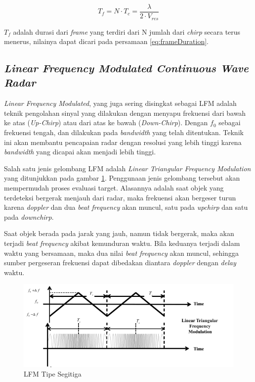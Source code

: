 \begin{equation}
	T_{f} = N \cdot T_{c} = \frac{\lambda}{2 \cdot V_{res}}
	\label{eq:frameDuration}
\end{equation}

$T_{f}$ adalah durasi dari \textit{frame} yang terdiri dari N jumlah dari \textit{chirp} secara terus menerus, nilainya dapat dicari pada persamaan \ref{eq:frameDuration}.

\subsection{\textit{Linear Frequency Modulated Continuous Wave Radar}}
\textit{Linear Frequency Modulated}, yang juga sering disingkat sebagai LFM adalah teknik pengolahan sinyal yang dilakukan dengan menyapu frekuensi dari bawah ke atas (\textit{Up-Chirp}) atau dari atas ke bawah (\textit{Down-Chirp}). Dengan $f_{0}$ sebagai frekuensi tengah, dan dilakukan pada \textit{bandwidth} yang telah ditentukan. Teknik ini akan membantu pencapaian radar dengan resolusi yang lebih tinggi karena \textit{bandwidth} yang dicapai akan menjadi lebih tinggi.

Salah satu jenis gelombang LFM adalah \textit{Linear Triangular Frequency Modulation} yang ditunjukkan pada gambar \ref{pic:LFMTriangular}. Penggunaan jenis gelombang tersebut akan mempermudah proses evaluasi target. Alasannya adalah saat objek yang terdeteksi bergerak menjauh dari radar, maka frekuensi akan bergeser turun karena \textit{doppler} dan dua \textit{beat frequency} akan muncul, satu pada \textit{upchirp} dan satu pada \textit{downchirp}. 

Saat objek berada pada jarak yang jauh, namun tidak bergerak, maka akan terjadi \textit{beat frequency} akibat kemunduran waktu. Bila keduanya terjadi dalam waktu yang bersamaan, maka dua nilai \textit{beat frequency} akan muncul, sehingga sumber pergeseran frekuensi dapat dibedakan diantara \textit{doppler} dengan \textit{delay} waktu.

\begin{figure}
	\begin{center}
		\includegraphics[scale=0.55]{pics/bab2/lfmTriangular.png}
		\caption[LFM Tipe Segitiga]{LFM Tipe Segitiga \cite{Jankiraman2018}}
		\label{pic:LFMTriangular}
	\end{center}
\end{figure}


